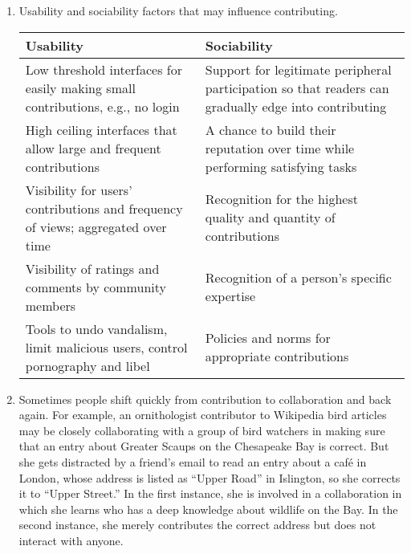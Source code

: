 \documentclass[11pt]{scrartcl}
\begin{document}
\begin{enumerate}
		\item Usability and sociability factors that may influence contributing.\\
		\begin{tabular}{ | p{6,5cm} | p{} |}
			\hline
			Usability & Sociability\\ \hline
			Low threshold interfaces for easily making small contributions, e.g., no login & Support for legitimate peripheral participation so that readers can gradually edge into contributing\\ \hline
			High ceiling interfaces that allow large and frequent contributions & A chance to build their reputation over time while performing satisfying tasks\\ \hline
			Visibility for users’ contributions and frequency of views; aggregated over time & Recognition for the highest quality and quantity of contributions\\ \hline
			Visibility of ratings and comments by community members & Recognition of a person’s specific expertise\\ \hline
			Tools to undo vandalism, limit malicious users, control pornography and libel & Policies and norms for appropriate contributions\\ \hline
		\end{tabular}

		\item Sometimes people shift quickly from contribution to collaboration and back again. For example, an ornithologist contributor to Wikipedia bird articles may be closely collaborating with a group of bird watchers in making sure that an entry about Greater Scaups on the Chesapeake Bay is correct. But she gets distracted by a friend’s email to read an entry about a café in London, whose address is listed as “Upper Road” in Islington, so she corrects it to “Upper Street.” In the first instance, she is involved in a collaboration in which she learns who has a deep knowledge about wildlife on the Bay. In the second instance, she merely contributes the correct address but does not interact with anyone.


\end{enumerate}
\end{document}
